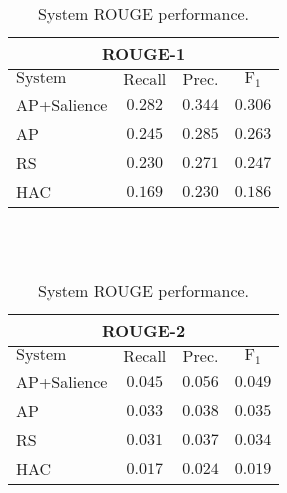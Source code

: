 \begin{table}[h]
\centering
\begin{tabular}{l c c c}
\multicolumn{4}{c}{ROUGE-1}\\
\hline
\hline
$\mathrm{System}$ & $\mathrm{Recall}$ & $\mathrm{Prec.}$ & $\mathrm{F}_1$\\
[0.5ex]
\hline
AP+Salience & $\mathbf{0.282}$ & $\mathbf{0.344}$ & $\mathbf{0.306}$ \\
AP          & $0.245$ & $0.285$ & $0.263$ \\
RS          & $0.230$ & $0.271$ & $0.247$ \\
HAC         & $0.169$ & $0.230$ & $0.186$ \\
\hline %
\end{tabular}
~\\[1ex]
~\\
\begin{tabular}{l c c c}
\multicolumn{4}{c}{ROUGE-2}\\
\hline
\hline
$\mathrm{System}$ & $\mathrm{Recall}$ & $\mathrm{Prec.}$ & $\mathrm{F}_1$\\[0.5ex]
\hline
AP+Salience & $\mathbf{0.045}$ & $\mathbf{0.056}$ & $\mathbf{0.049}$ \\
AP          & $0.033$ & $0.038$ & $0.035$ \\
RS          & $0.031$ & $0.037$ & $0.034$ \\
HAC         & $0.017$ & $0.024$ & $0.019$ \\
\hline %
\end{tabular}
%
%
\caption{System ROUGE performance.} %
\label{tab:rouge}
\vspace{-14pt}
\end{table}




